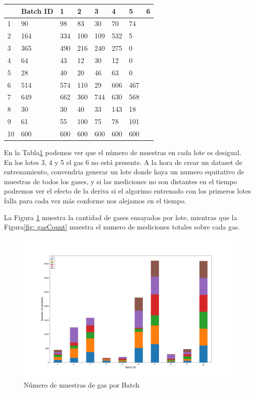 \begin{table}
    \centering
    \begin{tabular}{|l|l|l|l|l|l|l|l|}
    \hline
         & Batch ID & 1 & 2 & 3 & 4 & 5 & 6 \\ \hline
        1 & 90   & 98  & 83  & 30  & 70  & 74 &  \\ \hline
        2 & 164  & 334 & 100 & 109 & 532 & 5   &  \\ \hline
        3 & 365  & 490 & 216 & 240 & 275 & 0   &  \\ \hline
        4 & 64   & 43  & 12  & 30  & 12  & 0   &  \\ \hline
        5 & 28   & 40  & 20  & 46  & 63  & 0   &  \\ \hline
        6 & 514  & 574 & 110 & 29  & 606 & 467 &  \\ \hline
        7 & 649  & 662 & 360 & 744 & 630 & 568 &  \\ \hline
        8 & 30   & 30  & 40  & 33  & 143 & 18  &  \\ \hline
        9 & 61   & 55  & 100 & 75  & 78  & 101 &  \\ \hline
        10 & 600 & 600 & 600 & 600 & 600 & 600 &  \\ \hline
    \end{tabular}
    \label{Tab: Numero de Gases por cada Batch}
\end{table}

En la Tabla\ref{Tab: Numero de Gases por cada Batch} podemos ver que el número de muestras en cada lote
es desigual. En los lotes 3, 4 y 5 el gas 6 no está presente. A la hora de crear un dataset de entrenamiento,
convendria generar un lote donde haya un numero equitativo de muestras de todos los gases,
y si las mediciones no son distantes en el tiempo podremos ver el efecto de la deriva si el algorimo entrenado con
los primeros lotes falla para cada vez más conforme nos alejamos en el tiempo.

La Figura \ref{fig: gasBatchCount} muestra la cantidad de gases ensayados por lote, mientras que
la Figura\ref{fig: gasCount} muestra el numero de mediciones totales sobre cada gas.

\begin{figure}[ht!]
	\centering
	\includegraphics[width=\columnwidth]{../py_imgs/Step0_Count_Batch_Gas.png}
	\caption{Número de muestras de gas por Batch}
	\label{fig: gasBatchCount}
\end{figure}

